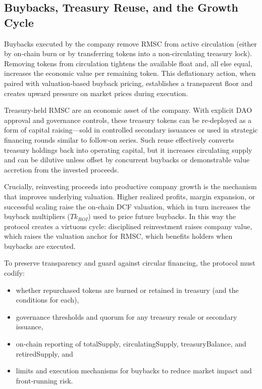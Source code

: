 \documentclass[conference]{IEEEtran}
\begin{document}
\subsection{Buybacks, Treasury Reuse, and the Growth Cycle}

Buybacks executed by the company remove RMSC from active circulation (either by on‑chain burn or by transferring tokens into a non‑circulating treasury lock). Removing tokens from circulation tightens the available float and, all else equal, increases the economic value per remaining token. This deflationary action, when paired with valuation‑based buyback pricing, establishes a transparent floor and creates upward pressure on market prices during execution.

Treasury‑held RMSC are an economic asset of the company. With explicit DAO approval and governance controls, these treasury tokens can be re‑deployed as a form of capital raising—sold in controlled secondary issuances or used in strategic financing rounds similar to follow‑on series. Such reuse effectively converts treasury holdings back into operating capital, but it increases circulating supply and can be dilutive unless offset by concurrent buybacks or demonstrable value accretion from the invested proceeds.

Crucially, reinvesting proceeds into productive company growth is the mechanism that improves underlying valuation. Higher realized profits, margin expansion, or successful scaling raise the on‑chain DCF valuation, which in turn increases the buyback multipliers ($Tk_{ROI}$) used to price future buybacks. In this way the protocol creates a virtuous cycle: disciplined reinvestment raises company value, which raises the valuation anchor for RMSC, which benefits holders when buybacks are executed.

To preserve transparency and guard against circular financing, the protocol must codify:
\begin{itemize}
    \item whether repurchased tokens are burned or retained in treasury (and the conditions for each),
    \item governance thresholds and quorum for any treasury resale or secondary issuance,
    \item on‑chain reporting of totalSupply, circulatingSupply, treasuryBalance, and retiredSupply, and
    \item limits and execution mechanisms for buybacks  to reduce market impact and front‑running risk.
\end{itemize}
\end{document}
